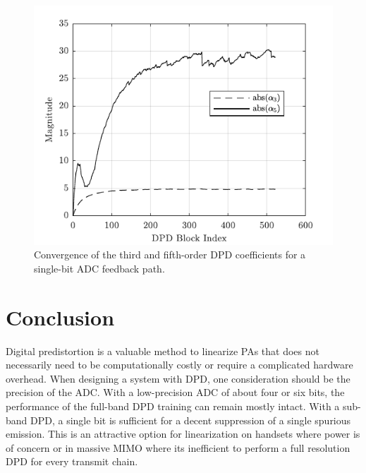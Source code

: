 \documentclass[conference]{IEEEtran}
\begin{document}
\begin{figure}[]
	\centering
	\includegraphics{SubBandConWARP}
	\caption{Convergence of the third and fifth-order DPD coefficients for a single-bit ADC feedback path.}
	\label{WARPCon}
\end{figure}


\section{Conclusion}
Digital predistortion is a valuable method to linearize PAs that does not necessarily need to be computationally costly or require a complicated hardware overhead. 
When designing a system with DPD, one consideration should be the precision of the ADC. 
With a low-precision ADC of about four or six bits, the performance of the full-band DPD training can remain mostly intact.
With a sub-band DPD, a single bit is sufficient for a decent suppression of a single spurious emission. This is an attractive option for linearization on handsets where power is of concern or in massive MIMO where its inefficient to perform a full resolution DPD for every transmit chain.




%





\end{document}
